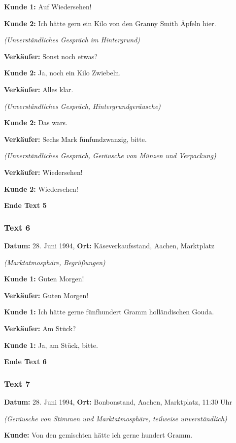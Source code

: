 \documentclass[
]{article}
\begin{document}
\textbf{Kunde 1:} Auf Wiedersehen!

\textbf{Kunde 2:} Ich hätte gern ein Kilo von den Granny Smith Äpfeln
hier.

\emph{(Unverständliches Gespräch im Hintergrund)}

\textbf{Verkäufer:} Sonst noch etwas?

\textbf{Kunde 2:} Ja, noch ein Kilo Zwiebeln.

\textbf{Verkäufer:} Alles klar.

\emph{(Unverständliches Gespräch, Hintergrundgeräusche)}

\textbf{Kunde 2:} Das war\textquotesingle s.

\textbf{Verkäufer:} Sechs Mark fünfundzwanzig, bitte.

\emph{(Unverständliches Gespräch, Geräusche von Münzen und Verpackung)}

\textbf{Verkäufer:} Wiedersehen!

\textbf{Kunde 2:} Wiedersehen!

\textbf{Ende Text 5}

\subsubsection{\texorpdfstring{\textbf{Text 6}}{Text 6}}\label{text-6}

\textbf{Datum:} 28. Juni 1994, \textbf{Ort:} Käseverkaufsstand, Aachen,
Marktplatz

\emph{(Marktatmosphäre, Begrüßungen)}

\textbf{Kunde 1:} Guten Morgen!

\textbf{Verkäufer:} Guten Morgen!

\textbf{Kunde 1:} Ich hätte gerne fünfhundert Gramm holländischen Gouda.

\textbf{Verkäufer:} Am Stück?

\textbf{Kunde 1:} Ja, am Stück, bitte.

\textbf{Ende Text 6}

\subsubsection{\texorpdfstring{\textbf{Text 7}}{Text 7}}\label{text-7}

\textbf{Datum:} 28. Juni 1994, \textbf{Ort:} Bonbonstand, Aachen,
Marktplatz, 11:30 Uhr

\emph{(Geräusche von Stimmen und Marktatmosphäre, teilweise
unverständlich)}

\textbf{Kunde:} Von den gemischten hätte ich gerne hundert Gramm.
\end{document}
